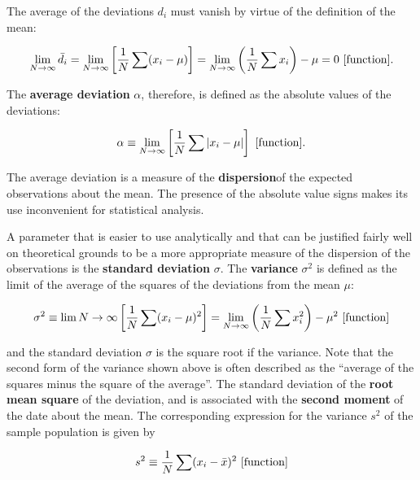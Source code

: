 \documentclass[a4paper,10pt]{article}
\begin{document}
{\noindent}The average of the deviations $d_i$ must vanish by virtue of the definition of the mean:

\begin{align*}
    \lim_{N\rightarrow\infty} \bar{d_i} = \lim_{N\rightarrow\infty} \left[ \frac{1}{N} \sum(x_i-\mu) \right] = \lim_{N\rightarrow\infty}\left(\frac{1}{N}\sum x_i\right) - \mu = 0 ~ [{\rm function}].
\end{align*}

{\noindent}The \textbf{average deviation} $\alpha$, therefore, is defined as the absolute values of the deviations:

\begin{align*}
    \alpha \equiv \lim_{N\rightarrow\infty}\left[ \frac{1}{N} \sum \left\lvert x_i-\mu\right\rvert \right] ~ [{\rm function}].
\end{align*}

{\noindent}The average deviation is a measure of the \textbf{dispersion}of the expected observations about the mean. The presence of the absolute value signs makes its use inconvenient for statistical analysis.

{\noindent}A parameter that is easier to use analytically and that can be justified fairly well on theoretical grounds to be a more appropriate measure of the dispersion of the observations is the \textbf{standard deviation} $\sigma$. The \textbf{variance} $\sigma^2$ is defined as the limit of the average of the squares of the deviations from the mean $\mu$:

\begin{align*}
    \sigma^2 \equiv \lim{N\rightarrow\infty} \left[\frac{1}{N}\sum(x_i-\mu)^2\right] = \lim_{N\rightarrow\infty} \left(\frac{1}{N}\sum x_i^2\right)-\mu^2 ~ [{\rm function}]
\end{align*}

{\noindent}and the standard deviation $\sigma$ is the square root if the variance. Note that the second form of the variance shown above is often described as the ``average of the squares minus the square of the average''. The standard deviation of the \textbf{root mean square} of the deviation, and is associated with the \textbf{second moment} of the date about the mean. The corresponding expression for the variance $s^2$ of the sample population is given by

\begin{align*}
    s^2 \equiv \frac{1}{N} \sum (x_i-\bar{x})^2 ~ [{\rm function}]
\end{align*}
\end{document}
